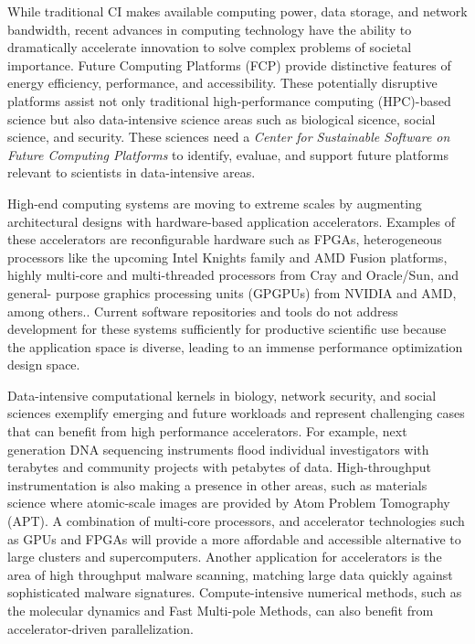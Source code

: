 While traditional CI makes available computing power, data storage, and network bandwidth, recent advances in computing technology have the ability to dramatically accelerate innovation to solve complex problems of societal importance. Future Computing Platforms (FCP) provide distinctive features of energy efficiency, performance, and accessibility. These potentially disruptive platforms assist not only traditional high-performance computing (HPC)-based science but also data-intensive science areas such as biological sicence, social science, and security.  These sciences need a \textit{Center for Sustainable Software on Future Computing Platforms} to identify, evaluae, and support future platforms relevant to scientists in data-intensive areas.

High-end computing systems are moving to extreme scales by augmenting architectural designs with hardware-based application accelerators. Examples of these accelerators are reconfigurable hardware such as FPGAs, heterogeneous processors like the upcoming Intel Knights family and AMD Fusion platforms, highly multi-core and multi-threaded processors from Cray and Oracle/Sun, and general- purpose graphics processing units (GPGPUs) from NVIDIA and AMD, among others.. Current software repositories and tools do not address development for these systems sufficiently for productive scientific use because the application space is diverse, leading to an immense performance optimization design space.

Data-intensive computational kernels in biology, network security, and social sciences exemplify emerging and future workloads and represent challenging cases that can benefit from high performance accelerators. For example, next generation DNA sequencing instruments flood individual investigators with terabytes and community projects with petabytes of data. High-throughput instrumentation is also making a presence in other areas, such as materials science where atomic-scale images are provided by Atom Problem Tomography (APT). A combination of multi-core processors, and accelerator technologies such as GPUs and FPGAs will provide a more affordable and accessible alternative to large clusters and supercomputers. Another application for accelerators is the area of high throughput malware scanning, matching large data quickly against sophisticated malware signatures. Compute-intensive numerical methods, such as the molecular dynamics and Fast Multi-pole Methods, can also benefit from accelerator-driven parallelization.


